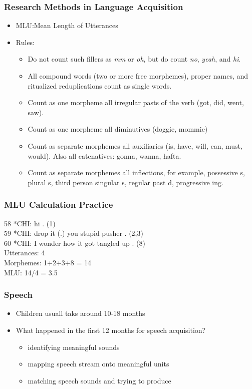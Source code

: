 \documentclass{beamer}
\begin{document}
\begin{frame}
\frametitle{Research Methods in Language Acquisition}
\begin{itemize}
\item MLU:Mean Length of Utterances
\item Rules:
\begin{itemize}
    \item Do not count such fillers as \textit{mm} or \textit{oh}, but do count \textit{no}, \textit{yeah}, and \textit{hi}.
    \item All compound words (two or more free morphemes), proper names, and ritualized reduplications count as single words.
    \item Count as one morpheme all irregular pasts of the verb (got, did, went, saw).
    \item Count as one morpheme all diminutives (doggie, mommie) 
    \item Count as separate morphemes all auxiliaries (is, have, will, can, must, would). Also all catenatives: gonna, wanna, hafta. 
    \item Count as separate morphemes all inflections, for example, possessive {s}, plural {s}, third person singular {s}, regular past {d}, progressive {ing}.
\end{itemize}
\end{itemize}
\end{frame}
\begin{frame}
\frametitle{MLU Calculation Practice}
58	*CHI:	hi .
\pasue (1)\\
59	*CHI:	drop it (.) you stupid pusher .
\pause (2,3)\\
60	*CHI:	I wonder how it got tangled up .
\pause (8)\\
\pause
Utterances: 4\\
Morphemes: 1+2+3+8 = 14\\
MLU: 14/4 = 3.5\\
\end{frame}
\begin{frame}
\frametitle{Speech}
\begin{itemize}
    \item Children usuall taks around 10-18 months
    \item What happened in the first 12 months for speech acquisition?
    \begin{itemize}
        \item identifying meaningful sounds
        \item mapping speech stream onto meaningful units
        \item matching speech sounds and trying to produce
    \end{itemize}
\end{itemize}
\end{frame}
\end{document}
